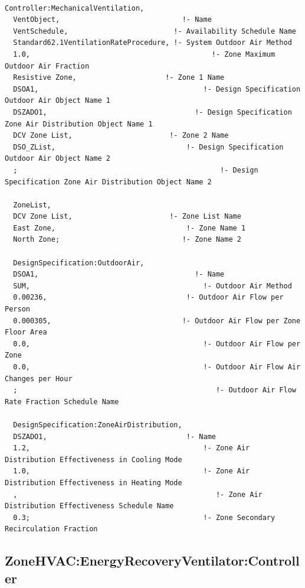 \begin{lstlisting}

Controller:MechanicalVentilation,
  VentObject,                             !- Name
  VentSchedule,                         !- Availability Schedule Name
  Standard62.1VentilationRateProcedure, !- System Outdoor Air Method
  1.0,                                           !- Zone Maximum Outdoor Air Fraction
  Resistive Zone,                     !- Zone 1 Name
  DSOA1,                                       !- Design Specification Outdoor Air Object Name 1
  DSZADO1,                                   !- Design Specification Zone Air Distribution Object Name 1
  DCV Zone List,                       !- Zone 2 Name
  DSO_ZList,                               !- Design Specification Outdoor Air Object Name 2
  ;                                                !- Design Specification Zone Air Distribution Object Name 2

  ZoneList,
  DCV Zone List,                       !- Zone List Name
  East Zone,                               !- Zone Name 1
  North Zone;                             !- Zone Name 2

  DesignSpecification:OutdoorAir,
  DSOA1,                                     !- Name
  SUM,                                         !- Outdoor Air Method
  0.00236,                                 !- Outdoor Air Flow per Person
  0.000305,                               !- Outdoor Air Flow per Zone Floor Area
  0.0,                                         !- Outdoor Air Flow per Zone
  0.0,                                         !- Outdoor Air Flow Air Changes per Hour
  ;                                               !- Outdoor Air Flow Rate Fraction Schedule Name

  DesignSpecification:ZoneAirDistribution,
  DSZADO1,                                 !- Name
  1.2,                                         !- Zone Air Distribution Effectiveness in Cooling Mode
  1.0,                                         !- Zone Air Distribution Effectiveness in Heating Mode
  ,                                               !- Zone Air Distribution Effectiveness Schedule Name
  0.3;                                         !- Zone Secondary Recirculation Fraction
\end{lstlisting}

\subsection{ZoneHVAC:EnergyRecoveryVentilator:Controller}\label{zonehvacenergyrecoveryventilatorcontroller}


